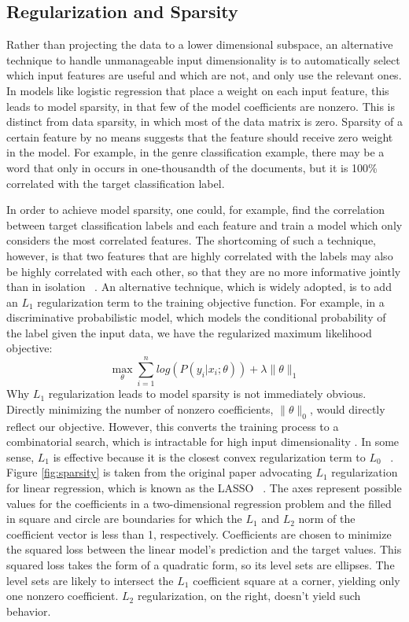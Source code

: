 \documentclass[]{article}
\begin{document}
\subsection{Regularization and Sparsity}
	Rather than projecting the data to a lower dimensional subspace, an alternative technique to handle unmanageable input dimensionality is to automatically select which input features are useful and which are not, and only use the relevant ones. In models like logistic regression that place a weight on each input feature, this leads to model sparsity, in that few of the model coefficients are nonzero. This is distinct from data sparsity, in which most of the data matrix is zero. Sparsity of a certain feature by no means suggests that the feature should receive zero weight in the model. For example, in the genre classification example, there may be a word that only in occurs in one-thousandth of the documents, but it is 100\% correlated with the target classification label. 

	In order to achieve model sparsity, one could, for example, find the correlation between target classification labels and each feature and train a model which only considers the most correlated features. The shortcoming of such a technique, however, is that two features that are highly correlated with the labels may also be highly correlated with each other, so that they are no more informative jointly than in isolation ~\cite{tibshirani1996regression}. An alternative technique, which is widely adopted, is to add an $L_1$ regularization term to the training objective function. For example, in a discriminative probabilistic model, which models the conditional probability of the label given the input data, we have the regularized maximum likelihood objective: 
	$$\max_{\theta} \sum_{i = 1}^n log\left(P(y_i | x_i; \theta)\right) + \lambda \lVert \theta \rVert_1$$
Why $L_1$ regularization leads to model sparsity is not immediately obvious. Directly minimizing the number of nonzero coefficients, $\lVert \theta \rVert_0$, would directly reflect our objective. However, this converts the training process to a combinatorial search, which is intractable for high input dimensionality . In some sense, $L_1$ is effective because it is the closest convex regularization term to $L_0$ ~\cite{LectureL1}. Figure \ref{fig:sparsity} is taken from the original paper advocating $L_1$ regularization for linear regression, which is known as the LASSO  ~\cite{tibshirani1996regression}. The axes represent possible values for the coefficients in a two-dimensional regression problem and the filled in square and circle are boundaries for which the $L_1$ and $L_2$ norm of the coefficient vector is less than 1, respectively. Coefficients are chosen to minimize the squared loss between the linear model's prediction and the target values. This squared loss takes the form of a quadratic form, so its level sets are ellipses. The level sets are likely to intersect the $L_1$ coefficient square at a corner, yielding only one nonzero coefficient. $L_2$ regularization, on the right, doesn't yield such behavior. 
\end{document}
